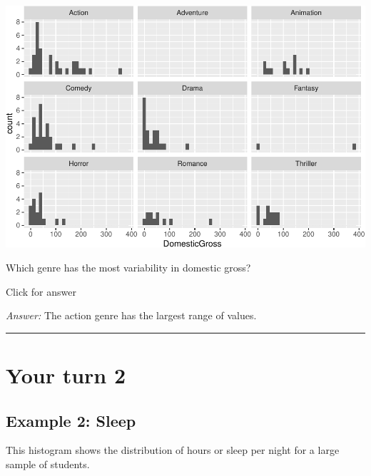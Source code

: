\documentclass[
]{book}
\newenvironment{Shaded}{\begin{snugshade}}{\end{snugshade}}
\newcommand{\AttributeTok}[1]{\textcolor[rgb]{0.77,0.63,0.00}{#1}}
\newcommand{\FunctionTok}[1]{\textcolor[rgb]{0.00,0.00,0.00}{#1}}
\newcommand{\NormalTok}[1]{#1}
\newcommand{\OtherTok}[1]{\textcolor[rgb]{0.56,0.35,0.01}{#1}}
\newcommand{\SpecialCharTok}[1]{\textcolor[rgb]{0.00,0.00,0.00}{#1}}
\newcommand{\StringTok}[1]{\textcolor[rgb]{0.31,0.60,0.02}{#1}}
\begin{document}
\includegraphics[width=1\linewidth]{Class_Activity_5_files/figure-latex/unnamed-chunk-15-1}

Which genre has the most variability in domestic gross?

Click for answer

\emph{Answer:} The action genre has the largest range of values.

\begin{center}\rule{0.5\linewidth}{0.5pt}\end{center}

\hypertarget{your-turn-2-3}{%
\section{Your turn 2}\label{your-turn-2-3}}

\hypertarget{example-2-sleep}{%
\subsection{Example 2: Sleep}\label{example-2-sleep}}

This histogram shows the distribution of hours or sleep per night for a large sample of students.

\begin{Shaded}
\end{Shaded}
\end{document}
